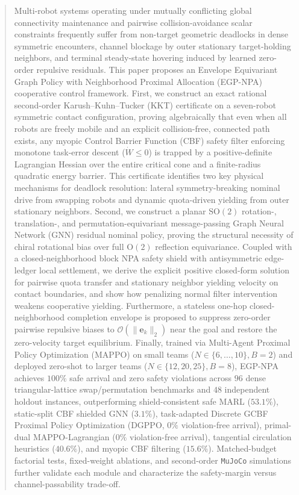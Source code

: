 \documentclass[journal]{IEEEtran}
\begin{document}
\begin{abstract}
Multi-robot systems operating under mutually conflicting global connectivity maintenance and pairwise collision-avoidance scalar constraints frequently suffer from non-target geometric deadlocks in dense symmetric encounters, channel blockage by outer stationary target-holding neighbors, and terminal steady-state hovering induced by learned zero-order repulsive residuals. This paper proposes an Envelope Equivariant Graph Policy with Neighborhood Proximal Allocation (EGP-NPA) cooperative control framework. First, we construct an exact rational second-order Karush--Kuhn--Tucker (KKT) certificate on a seven-robot symmetric contact configuration, proving algebraically that even when all robots are freely mobile and an explicit collision-free, connected path exists, any myopic Control Barrier Function (CBF) safety filter enforcing monotone task-error descent ($\dot{W}\le 0$) is trapped by a positive-definite Lagrangian Hessian over the entire critical cone and a finite-radius quadratic energy barrier. This certificate identifies two key physical mechanisms for deadlock resolution: lateral symmetry-breaking nominal drive from swapping robots and dynamic quota-driven yielding from outer stationary neighbors. Second, we construct a planar $\mathrm{SO}(2)$ rotation-, translation-, and permutation-equivariant message-passing Graph Neural Network (GNN) residual nominal policy, proving the structural necessity of chiral rotational bias over full $\mathrm{O}(2)$ reflection equivariance. Coupled with a closed-neighborhood block NPA safety shield with antisymmetric edge-ledger local settlement, we derive the explicit positive closed-form solution for pairwise quota transfer and stationary neighbor yielding velocity on contact boundaries, and show how penalizing normal filter intervention weakens cooperative yielding. Furthermore, a stateless one-hop closed-neighborhood completion envelope is proposed to suppress zero-order pairwise repulsive biases to $\mathcal{O}(\lVert\boldsymbol{e}_k\rVert_2)$ near the goal and restore the zero-velocity target equilibrium. Finally, trained via Multi-Agent Proximal Policy Optimization (MAPPO) on small teams ($N\in\{6,\dots,10\}, B=2$) and deployed zero-shot to larger teams ($N\in\{12,20,25\}, B=8$), EGP-NPA achieves $100\%$ safe arrival and zero safety violations across $96$ dense triangular-lattice swap/permutation benchmarks and $48$ independent holdout instances, outperforming shield-consistent safe MARL ($53.1\%$), static-split CBF shielded GNN ($3.1\%$), task-adapted Discrete GCBF Proximal Policy Optimization (DGPPO, $0\%$ violation-free arrival), primal-dual MAPPO-Lagrangian ($0\%$ violation-free arrival), tangential circulation heuristics ($40.6\%$), and myopic CBF filtering ($15.6\%$). Matched-budget factorial tests, fixed-weight ablations, and second-order \texttt{MuJoCo} simulations further validate each module and characterize the safety-margin versus channel-passability trade-off.
\end{abstract}
\end{document}
